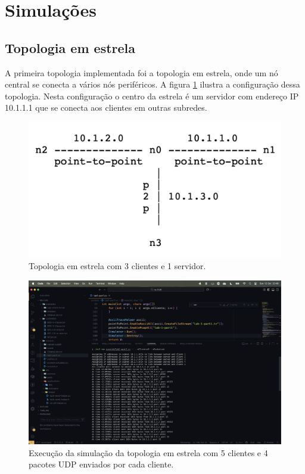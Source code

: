 \documentclass[12pt,a4paper]{article}
\begin{document}
\section{Simulações}

\subsection{Topologia em estrela}

A primeira topologia implementada foi a topologia em estrela, onde um nó central se conecta a vários nós periféricos. A figura \ref{fig:star_topology_layout} ilustra a configuração dessa topologia. Nesta configuração o centro da estrela é um servidor com endereço IP 10.1.1.1 que se conecta aos clientes em outras subredes.

\begin{figure}[H]
    \centering
    \includegraphics[width=1\textwidth]{star_topology.png}
    \caption{Topologia em estrela com 3 clientes e 1 servidor.}
    \label{fig:star_topology_layout}
\end{figure}


\begin{figure}[H]
    \centering
    \includegraphics[width=1\textwidth]{lab1_exec_5_4.png}
    \caption{Execução da simulação da topologia em estrela com 5 clientes e 4 pacotes UDP enviados por cada cliente.}
    \label{fig:star_topology}
\end{figure}
\end{document}
